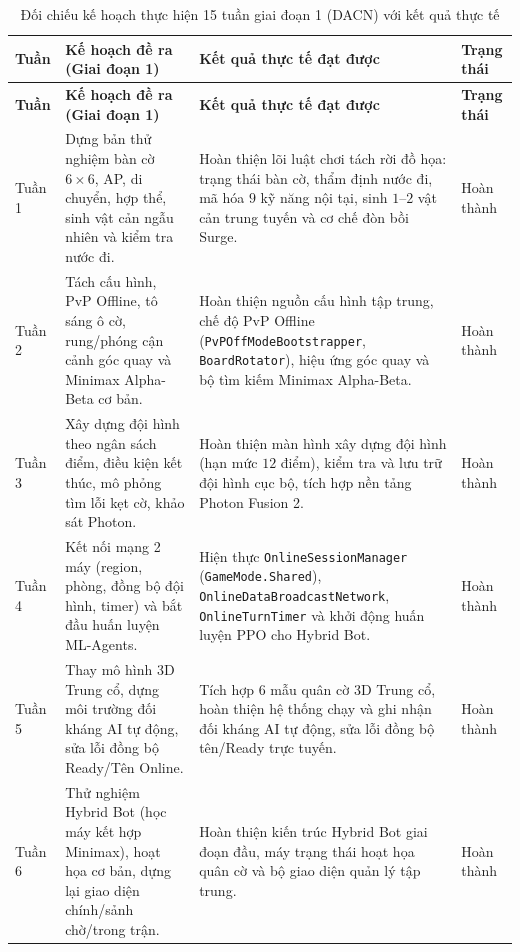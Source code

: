 \begin{longtable}{|C{1.3cm}|L{5.4cm}|L{5.5cm}|C{2.6cm}|}
    \caption{Đối chiếu kế hoạch thực hiện 15 tuần giai đoạn 1 (DACN) với kết quả thực tế}
    \label{tab:stage1_progress} \\
    \hline
    \textbf{Tuần} & \textbf{Kế hoạch đề ra (Giai đoạn 1)} & \textbf{Kết quả thực tế đạt được} & \textbf{Trạng thái} \\
    \hline
    \endfirsthead
    \hline
    \textbf{Tuần} & \textbf{Kế hoạch đề ra (Giai đoạn 1)} & \textbf{Kết quả thực tế đạt được} & \textbf{Trạng thái} \\
    \hline
    \endhead
    \hline
    \endfoot

    Tuần 1 & Dựng bản thử nghiệm bàn cờ $6 \times 6$, AP, di chuyển, hợp thể, sinh vật cản ngẫu nhiên và kiểm tra nước đi. & Hoàn thiện lõi luật chơi tách rời đồ họa: trạng thái bàn cờ, thẩm định nước đi, mã hóa $9$ kỹ năng nội tại, sinh $1$--$2$ vật cản trung tuyến và cơ chế đòn bồi Surge. & Hoàn thành \\
    \hline
    Tuần 2 & Tách cấu hình, PvP Offline, tô sáng ô cờ, rung/phóng cận cảnh góc quay và Minimax Alpha-Beta cơ bản. & Hoàn thiện nguồn cấu hình tập trung, chế độ PvP Offline (\texttt{PvPOffModeBootstrapper}, \texttt{BoardRotator}), hiệu ứng góc quay và bộ tìm kiếm Minimax Alpha-Beta. & Hoàn thành \\
    \hline
    Tuần 3 & Xây dựng đội hình theo ngân sách điểm, điều kiện kết thúc, mô phỏng tìm lỗi kẹt cờ, khảo sát Photon. & Hoàn thiện màn hình xây dựng đội hình (hạn mức $12$ điểm), kiểm tra và lưu trữ đội hình cục bộ, tích hợp nền tảng Photon Fusion 2. & Hoàn thành \\
    \hline
    Tuần 4 & Kết nối mạng 2 máy (region, phòng, đồng bộ đội hình, timer) và bắt đầu huấn luyện ML-Agents. & Hiện thực \texttt{OnlineSessionManager} (\texttt{GameMode.Shared}), \texttt{OnlineDataBroadcastNetwork}, \texttt{OnlineTurnTimer} và khởi động huấn luyện PPO cho Hybrid Bot. & Hoàn thành \\
    \hline
    Tuần 5 & Thay mô hình 3D Trung cổ, dựng môi trường đối kháng AI tự động, sửa lỗi đồng bộ Ready/Tên Online. & Tích hợp $6$ mẫu quân cờ 3D Trung cổ, hoàn thiện hệ thống chạy và ghi nhận đối kháng AI tự động, sửa lỗi đồng bộ tên/Ready trực tuyến. & Hoàn thành \\
    \hline
    Tuần 6 & Thử nghiệm Hybrid Bot (học máy kết hợp Minimax), hoạt họa cơ bản, dựng lại giao diện chính/sảnh chờ/trong trận. & Hoàn thiện kiến trúc Hybrid Bot giai đoạn đầu, máy trạng thái hoạt họa quân cờ và bộ giao diện quản lý tập trung. & Hoàn thành \\

\end{longtable}

